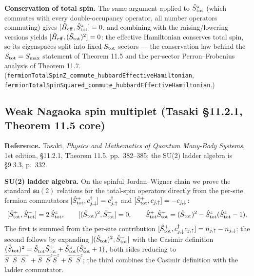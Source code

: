 \documentclass[a4paper,11pt]{article}
\begin{document}
\medskip
\noindent\textbf{Conservation of total spin.}
The same argument applied to \(\hat S^z_{\rm tot}\) (which commutes with every
double-occupancy operator, all number operators commuting) gives
\([\hat H_{\rm eff}, \hat S^z_{\rm tot}] = 0\), and combining with the
raising/lowering versions yields \([\hat H_{\rm eff}, (\hat S_{\rm tot})^2] = 0\):
the effective Hamiltonian conserves total spin, so its eigenspaces split into
fixed-\(S_{\rm tot}\) sectors — the conservation law behind the
\(S_{\rm tot} = S_{\max}\) statement of Theorem 11.5 and the per-sector
Perron--Frobenius analysis of Theorem 11.7. (\texttt{fermionTotalSpinZ\_commute\_hubbardEffectiveHamiltonian},
\texttt{fermionTotalSpinSquared\_commute\_hubbardEffectiveHamiltonian}.)

\subsection{Weak Nagaoka spin multiplet (Tasaki §11.2.1, Theorem 11.5 core)}
\label{subsec:weak-nagaoka-multiplet}

\noindent\textbf{Reference.} Tasaki, \emph{Physics and Mathematics of Quantum
Many-Body Systems}, 1st edition, §11.2.1, Theorem 11.5, pp.~382--385; the SU(2)
ladder algebra is §9.3.3, p.~332.

\medskip
\noindent\textbf{SU(2) ladder algebra.}
On the spinful Jordan--Wigner chain we prove the standard \(\mathfrak{su}(2)\)
relations for the total-spin operators directly from the per-site fermion
commutators \([\hat S^+_{\rm tot}, c^\dagger_{j,\downarrow}] = c^\dagger_{j,\uparrow}\)
and \([\hat S^+_{\rm tot}, c_{j,\uparrow}] = -c_{j,\downarrow}\):
\[
  [\hat S^+_{\rm tot}, \hat S^-_{\rm tot}] = 2\,\hat S^z_{\rm tot},
  \qquad
  [(\hat S_{\rm tot})^2, \hat S^-_{\rm tot}] = 0,
  \qquad
  \hat S^+_{\rm tot}\hat S^-_{\rm tot}
    = (\hat S_{\rm tot})^2 - \hat S^z_{\rm tot}(\hat S^z_{\rm tot} - 1).
\]
The first is summed from the per-site contribution
\([\hat S^+_{\rm tot}, c^\dagger_{j,\downarrow}c_{j,\uparrow}]
   = n_{j,\uparrow} - n_{j,\downarrow}\); the second follows by expanding
\([(\hat S_{\rm tot})^2, \hat S^-_{\rm tot}]\) with the Casimir definition
\((\hat S_{\rm tot})^2 = \hat S^-_{\rm tot}\hat S^+_{\rm tot}
   + \hat S^z_{\rm tot}(\hat S^z_{\rm tot}+1)\), both sides reducing to
\(\hat S^-\hat S^-\hat S^+ + \hat S^-\hat S^z\hat S^z + \hat S^-\hat S^z\); the
third combines the Casimir definition with the ladder commutator.
\end{document}
